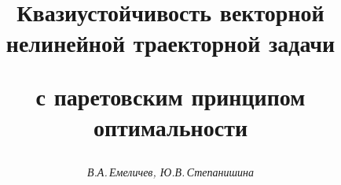 




%


\newcommand{\MINSUM}{\operatorname{MINSUM}}


\newcommand{\MINMAX}{\operatorname{MINMAX}}


\newcommand{\MINMIN}{\operatorname{MINMIN}}


\newcommand{\SUM}{\operatorname{SUM}}


\newcommand{\MAX}{\operatorname{MAX}}


\newcommand{\MIN}{\operatorname{MIN}}


\newcommand{\tts}[1]{}







\setcounter{page}{27}















\author{\it В.А.\,Емеличев, Ю.В.\,Степанишина}




\title{Квазиустойчивость векторной нелинейной траекторной задачи


с паретовским принципом оптимальности}





\date{}




\pagestyle{plain} %





